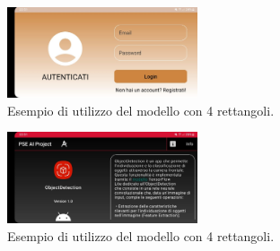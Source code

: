 \begin{figure}
    \centering
    \includegraphics[width=0.5\textwidth]{Immagini/App/login_orizzontale.jpeg}
    \caption{Esempio di utilizzo del modello con 4 rettangoli.}
    \label{fig:orizzontale1}
\end{figure}

\begin{figure}
    \centering
    \includegraphics[width=0.5\textwidth]{Immagini/App/info_orizzontale.jpeg}
    \caption{Esempio di utilizzo del modello con 4 rettangoli.}
    \label{fig:orizzontale2}
\end{figure}

